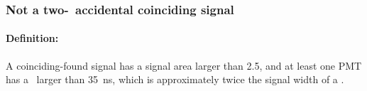 

\subsubsection{Not a two-\sphe\ accidental coinciding signal}
\paragraph{Definition:}
A coinciding-found signal has a signal area larger than \SI{2.5}{\phe}, and at least one PMT has a \stw\ larger than \SI{35}{\ns}, which is approximately twice the signal width of a \sphe .  
